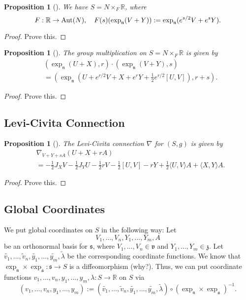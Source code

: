 \documentclass{amsart}[]
\newcommand{\R}{\mathbb R}
\newcommand{\why}{\color{red}(why?)\color{black}}
\newcommand{\alert}[1]{\color{red}#1\color{black}}
\newcommand{\aut}{\text{\normalfont Aut}}
\theoremstyle{plain}
\newtheorem{proposition}[theorem]{Proposition}
\theoremstyle{definition}
\theoremstyle{remark}
\begin{document}
	
	\begin{proposition}[{\cite[Section 4.1.3]{tricerri}}]
		We have $S = N \times_F \R$, where 
		$$F:\R \rightarrow \aut(N), \quad F(s)(\exp_{\mathfrak n}(V + Y)) := \exp_{\mathfrak n}(e^{s/2} V + e^s Y).$$
	\end{proposition}
	\begin{proof}
		\alert{Prove this.}
	\end{proof}
	
	\begin{proposition}[{\cite[Section 4.1.3]{tricerri}}]
		The group multiplication on $S = N \times_F \R$ is given by 
		\begin{align*}
			&(\exp_{\mathfrak n}(U+X),r) \cdot (\exp_{\mathfrak n}(V + Y),s)  \\
			&= \left(
			\exp_{\mathfrak n}\left(U + e^{r/2} V + X + e^r Y + \frac12 e^{r/2} [U,V]\right), r + s \right).
		\end{align*}
	\end{proposition}
	\begin{proof}
		\alert{Prove this.}
	\end{proof}
	
	\subsection{Levi-Civita Connection}
	\begin{proposition}[{\cite[Section 4.1.6]{tricerri}}]
		\label{connection}
		The Levi-Civita connection $\nabla$ for $(S,g)$ is given by
		\begin{align*}
			&\nabla_{V+ Y + sA}(U + X + rA)  \\
			& = - \frac12 J_X V - \frac12 J_Y U - \frac12 r V - \frac12 [U,V] - rY + \frac12 \langle U, V \rangle A + \langle X, Y \rangle A.
		\end{align*}
	\end{proposition}
	\begin{proof}
		\alert{Prove this.}
	\end{proof}
	\subsection{Global Coordinates}
	We put global coordinates on $S$ in the following way: Let $$V_1,\ldots,V_n, Y_1,\ldots,Y_m,A$$ be an orthonormal basis for $\mathfrak s$, where $V_1,\ldots, V_n \in \mathfrak v$ and $Y_1,\ldots,Y_m \in \mathfrak z$. Let $\widetilde{v_1},\ldots, {\widetilde v_n},\widetilde{y_1},\ldots, \widetilde{y_m}, \widetilde\lambda$ be the corresponding coordinate functions. We know that $\exp_{\mathfrak n} \times \exp_{\mathfrak a}: \mathfrak s \rightarrow S$ is a diffeomorphism \why. Thus, we can put coordinate functions $v_1,\ldots,v_n,y_1,\ldots,y_m,\lambda:S \rightarrow \R$ on $S$ via
	$$(v_1,\ldots,v_n,y_1,\ldots,y_m) := (\widetilde{v_1},\ldots, {\widetilde v_n},\widetilde{y_1},\ldots, \widetilde{y_m}, \widetilde\lambda) \circ (\exp_{\mathfrak n} \times \exp_{\mathfrak a})^{-1}.$$ 
\end{document}
